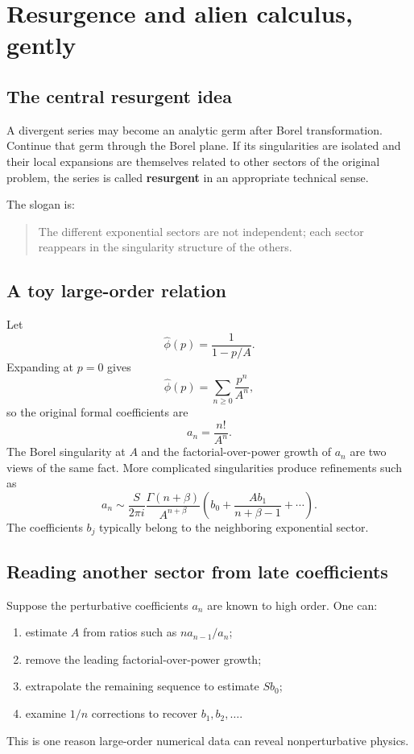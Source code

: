 \documentclass[11pt,openany]{book}
\theoremstyle{plain}
\theoremstyle{definition}
\theoremstyle{remark}
\newcommand{\defterm}[1]{\textbf{#1}}
\begin{document}
\chapter{Resurgence and alien calculus, gently}
\label{chap:resurgence}

\section{The central resurgent idea}
A divergent series may become an analytic germ after Borel transformation. Continue that germ through the Borel plane. If its singularities are isolated and their local expansions are themselves related to other sectors of the original problem, the series is called \defterm{resurgent} in an appropriate technical sense.

The slogan is:
\begin{quote}
The different exponential sectors are not independent; each sector reappears in the singularity structure of the others.
\end{quote}

\section{A toy large-order relation}
Let
\[
  \widehat\phi(p)=\frac1{1-p/A}.
\]
Expanding at $p=0$ gives
\[
  \widehat\phi(p)=\sum_{n\ge0}\frac{p^n}{A^n},
\]
so the original formal coefficients are
\[
  a_n=\frac{n!}{A^n}.
\]
The Borel singularity at $A$ and the factorial-over-power growth of $a_n$ are two views of the same fact. More complicated singularities produce refinements such as
\[
  a_n\sim
  \frac{S}{2\pi i}
  \frac{\Gamma(n+\beta)}{A^{n+\beta}}
  \left(b_0+\frac{A b_1}{n+\beta-1}+\cdots\right).
  \label{eq:large-order-template}
\]
The coefficients $b_j$ typically belong to the neighboring exponential sector.

\section{Reading another sector from late coefficients}
Suppose the perturbative coefficients $a_n$ are known to high order. One can:
\begin{enumerate}
\item estimate $A$ from ratios such as $n a_{n-1}/a_n$;
\item remove the leading factorial-over-power growth;
\item extrapolate the remaining sequence to estimate $S b_0$;
\item examine $1/n$ corrections to recover $b_1,b_2,\ldots$.
\end{enumerate}
This is one reason large-order numerical data can reveal nonperturbative physics.
\end{document}
